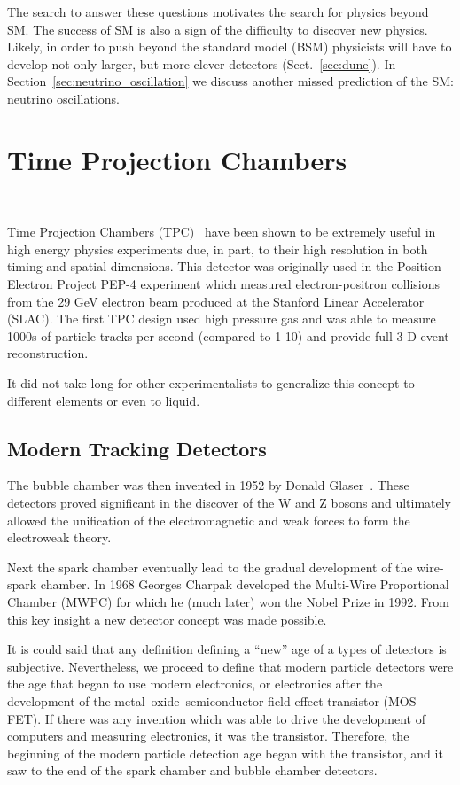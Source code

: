 The search to answer these questions motivates the search for physics beyond SM.
The success of SM is also a sign of the difficulty to discover new physics.
Likely, in order to push beyond the standard model (BSM) physicists will have to develop not only larger, but more clever detectors (Sect.~\ref{sec:dune}).
In Section~\ref{sec:neutrino_oscillation} we discuss another missed prediction of the SM: neutrino oscillations. 

\section{Time Projection Chambers}~\label{sec:tpcs}

Time Projection Chambers (TPC)~\citep{lartpc:nygren} have been shown to be extremely useful in high energy physics experiments due, in part, to their high resolution in both timing and spatial dimensions.
This detector was originally used in the Position-Electron Project PEP-4 experiment which measured electron-positron collisions from the 29 GeV electron beam produced at the Stanford Linear Accelerator (SLAC).
The first TPC design used high pressure gas and was able to measure 1000s of particle tracks per second (compared to 1-10) and provide full 3-D event reconstruction.

It did not take long for other experimentalists to generalize this concept to different elements or even to liquid.


\subsection{Modern Tracking Detectors}


The bubble chamber was then invented in 1952 by Donald Glaser~\citep{bubbleChamber_PhysRev.87.665}.
These detectors proved significant in the discover of the W and Z bosons and ultimately allowed the unification of the electromagnetic and weak forces to form the electroweak theory.

Next the spark chamber eventually lead to the gradual development of the wire-spark chamber.
In 1968 Georges Charpak developed the Multi-Wire Proportional Chamber (MWPC) for which he (much later) won the Nobel Prize in 1992.
From this key insight a new detector concept was made possible.

It is could said that any definition defining a ``new'' age of a types of detectors is subjective.
Nevertheless, we proceed to define that modern particle detectors were the age that began to use modern electronics, or electronics after the development of the metal–oxide–semiconductor field-effect transistor (MOS-FET).
If there was any invention which was able to drive the development of computers and  measuring electronics, it was the transistor.
Therefore, the beginning of the modern particle detection age began with the transistor, and it saw to the end of the spark chamber and bubble chamber detectors.

